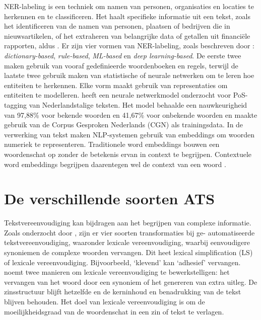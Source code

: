 \medspace

NER-labeling is een techniek om namen van personen, organisaties en locaties te herkennen en te classificeren. Het haalt specifieke informatie uit een tekst, zoals het identificeren van de namen van personen, plaatsen of bedrijven die in nieuwsartikelen, of het extraheren van belangrijke data of getallen uit financiële rapporten, aldus \textcite{Jurafsky2014}. Er zijn vier vormen van NER-labeling, zoals beschreven door \textcite{Li2018}: \textit{dictionary-based}, \textit{rule-based}, \textit{ML-based} en \textit{deep learning-based}. De eerste twee maken gebruik van vooraf gedefinieerde woordenboeken en regels, terwijl de laatste twee gebruik maken van statistische of neurale netwerken om te leren hoe entiteiten te herkennen. Elke vorm maakt gebruik van representaties om entiteiten te modelleren. \textcite{Poel2008} heeft een neurale netwerkmodel onderzocht voor PoS-tagging van Nederlandstalige teksten. Het model behaalde een nauwkeurigheid van 97,88\% voor bekende woorden en 41,67\% voor onbekende woorden en maakte gebruik van de Corpus Gesproken Nederlands (CGN) als trainingsdata. In de verwerking van tekst maken NLP-systemen gebruik van embeddings om woorden numeriek te representeren. Traditionele word embeddings bouwen een woordenschat op zonder de betekenis ervan in context te begrijpen. Contextuele word embeddings begrijpen daarentegen wel de context van een woord \autocite{Eisenstein2019}. 

\section{De verschillende soorten ATS}

Tekstvereenvoudiging kan bijdragen aan het begrijpen van complexe informatie. Zoals onderzocht door \textcite{Siddharthan2014}, zijn er vier soorten transformaties bij ge- automatiseerde tekstvereenvoudiging, waaronder lexicale vereenvoudiging, waarbij eenvoudigere synoniemen de complexe woorden vervangen. Dit heet lexical simplification (LS) of lexicale vereenvoudiging. Bijvoorbeeld, ‘klevend’ kan ‘adhesief’ vervangen. \textcite{Kandula2010} noemt twee manieren om lexicale vereenvoudiging te bewerkstelligen: het vervangen van het woord door een synoniem of het genereren van extra uitleg. De zinsstructuur blijft hetzelfde en de kerninhoud en benadrukking van de tekst blijven behouden. Het doel van lexicale vereenvoudiging is om de moeilijkheidsgraad van de woordenschat in een zin of tekst te verlagen.

